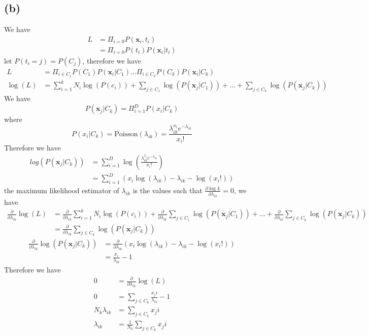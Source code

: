 \documentclass[12pt]{article}
\begin{document}
\subsection*{(b)}
We have
\begin{align*}
    L&=\Pi_{i=0}P(\textbf{x}_i,t_i)\\
    &=\Pi_{i=0}P(t_i)P(\textbf{x}_i|t_i)
\end{align*}
let $P(t_i=j)=P(C_j)$, therefore we have
\begin{align*}
    L&=\Pi_{i\in C_1}P(C_1)P(\textbf{x}_i|C_1)\dots \Pi_{i\in C_k}P(C_k)P(\textbf{x}_i|C_k)\\
    \log(L)&=\sum_{i=1}^{k}N_i\log(P(c_i))+\sum_{j\in C_1}\log(P(\textbf{x}_j|C_1))+
                    \dots+\sum_{j\in C_k}\log(P(\textbf{x}_j|C_k))
\end{align*}
We have
$$P(\textbf{x}_j|C_k)=\Pi_{i=1}^{D}P(x_i|C_k)$$
where
$$P(x_i|C_k)=\text{Poisson}(\lambda_{ik})=\frac{\lambda_{ik}^{x_i}e^{-\lambda_{ik}}}{x_i!}$$
Therefore we have
\begin{align*}
    log(P(\textbf{x}_j|C_k))&=\sum_{i=1}^{D}\log\left(\frac{\lambda_{ik}^{x_i}e^{-\lambda_{ik}}}{x_i!}\right)\\
    &=\sum_{i=1}^{D}\left(x_i\log(\lambda_{ik})-\lambda_{ik}-\log(x_i!)\right)
\end{align*}
the maximum likelihood estimator of $\lambda_{ik}$ is the values such that $\frac{\partial \log{L}}{\partial \lambda_{ik}}=0$, we have
\begin{align*}
    \frac{\partial}{\partial \lambda_{ik}}\log(L)&=\frac{\partial}{\partial \lambda_{ik}}\sum_{i=1}^{k}N_i\log(P(c_i))+\frac{\partial}{\partial \lambda_{ik}}\sum_{j\in C_1}\log(P(\textbf{x}_j|C_1))+
                    \dots+\frac{\partial}{\partial \lambda_{ik}}\sum_{j\in C_k}\log(P(\textbf{x}_j|C_k))\\
                    &=\frac{\partial}{\partial \lambda_{ik}}\sum_{j\in C_k}\log(P(\textbf{x}_j|C_k))
\end{align*}
\begin{align*}
    \frac{\partial}{\partial \lambda_{ik}}\log(P(\textbf{x}_j|C_k))&=\frac{\partial}{\partial \lambda_{ik}}\left(x_i\log(\lambda_{ik})-\lambda_{ik}-\log(x_i!)\right)\\
    &=\frac{x_i}{\lambda_{ik}}-1
\end{align*}
Therefore we have
\begin{align*}
    0&=\frac{\partial}{\partial \lambda_{ik}}\log(L)\\
    0&=\sum_{j\in C_k}\frac{x_ji}{\lambda_{ik}}-1\\
    N_k\lambda_{ik}&=\sum_{j\in C_k}x_ji\\
    \lambda_{ik}&=\boxed{\frac{1}{N_k}\sum_{j\in C_k}x_ji}
\end{align*}
\end{document}
